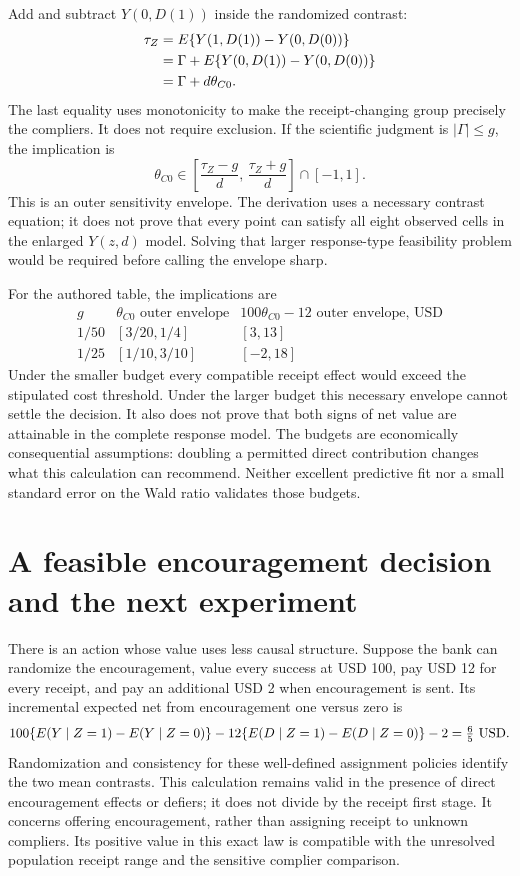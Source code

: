 Add and subtract $Y(0,D(1))$ inside the randomized contrast:
\begin{align}
 \tau_Z
 &=E\{Y(1,D(1))-Y(0,D(0))\} \notag\\
 &=\Gamma+
   E\{Y(0,D(1))-Y(0,D(0))\} \notag\\
 &=\Gamma+d\theta_{C0}.
 \label{exec17:s3-exclusion-decomposition}
\end{align}
The last equality uses monotonicity to make the receipt-changing group
precisely the compliers. It does not require exclusion.
If the scientific judgment is $|\Gamma|\leq g$, the implication is
\begin{equation}
 \theta_{C0}\in
 \left[\frac{\tau_Z-g}{d},\,\frac{\tau_Z+g}{d}\right]\cap[-1,1].
 \label{exec17:s3-exclusion-outer}
\end{equation}
This is an outer sensitivity envelope. The derivation uses a necessary
contrast equation; it does not prove that every point can satisfy all
eight observed cells in the enlarged $Y(z,d)$ model.
Solving that larger response-type feasibility problem would be required
before calling the envelope sharp.

For the authored table, the implications are
\[
\begin{array}{c|cc}
 g&\theta_{C0}\text{ outer envelope}
   &100\theta_{C0}-12\text{ outer envelope, USD}\\ \hline
 1/50&[3/20,1/4]&[3,13]\\
 1/25&[1/10,3/10]&[-2,18]
\end{array}
\]
Under the smaller budget every compatible receipt effect would exceed
the stipulated cost threshold. Under the larger budget this necessary
envelope cannot settle the decision. It also does not prove that both
signs of net value are attainable in the complete response model.
The budgets are economically consequential assumptions: doubling a
permitted direct contribution changes what this calculation can recommend.
Neither excellent predictive fit nor a small standard error on the
Wald ratio validates those budgets.

\section{A feasible encouragement decision and the next experiment}
\label{exec17:s3-sensitivity-decision}

There is an action whose value uses less causal structure. Suppose the
bank can randomize the encouragement, value every success at USD 100,
pay USD 12 for every receipt, and pay an additional USD 2 when
encouragement is sent. Its incremental expected net from encouragement
one versus zero is
\[
 100\{E(Y\mid Z=1)-E(Y\mid Z=0)\}
 -12\{E(D\mid Z=1)-E(D\mid Z=0)\}-2
 =\tfrac65\ {\rm USD}.
\]
Randomization and consistency for these well-defined assignment policies
identify the two mean contrasts. This calculation remains valid in
the presence of direct encouragement effects or defiers; it does not
divide by the receipt first stage. It concerns offering encouragement,
rather than assigning receipt to unknown compliers. Its positive value
in this exact law is compatible with the unresolved population receipt
range and the sensitive complier comparison.

